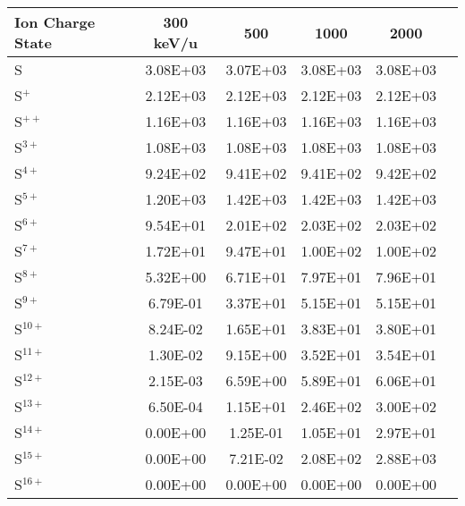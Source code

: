 \begin{table}[ht]
\begin{tabular}{l|c|c|c|c|c}
    Ion Charge State & 300 keV/u & 500 & 1000 & 2000 & \\
    \hline
    S         & 3.08E+03 & 3.07E+03 & 3.08E+03 & 3.08E+03 & \\
    S$^+$     & 2.12E+03 & 2.12E+03 & 2.12E+03 & 2.12E+03 & \\
    S$^{ ++}$ & 1.16E+03 & 1.16E+03 & 1.16E+03 & 1.16E+03 & \\
    S$^{ 3+}$ & 1.08E+03 & 1.08E+03 & 1.08E+03 & 1.08E+03 & \\
    S$^{ 4+}$ & 9.24E+02 & 9.41E+02 & 9.41E+02 & 9.42E+02 & \\
    S$^{ 5+}$ & 1.20E+03 & 1.42E+03 & 1.42E+03 & 1.42E+03 & \\
    S$^{ 6+}$ & 9.54E+01 & 2.01E+02 & 2.03E+02 & 2.03E+02 & \\
    S$^{ 7+}$ & 1.72E+01 & 9.47E+01 & 1.00E+02 & 1.00E+02 & \\
    S$^{ 8+}$ & 5.32E+00 & 6.71E+01 & 7.97E+01 & 7.96E+01 & \\
    S$^{ 9+}$ & 6.79E-01 & 3.37E+01 & 5.15E+01 & 5.15E+01 & \\
    S$^{10+}$ & 8.24E-02 & 1.65E+01 & 3.83E+01 & 3.80E+01 & \\
    S$^{11+}$ & 1.30E-02 & 9.15E+00 & 3.52E+01 & 3.54E+01 & \\
    S$^{12+}$ & 2.15E-03 & 6.59E+00 & 5.89E+01 & 6.06E+01 & \\
    S$^{13+}$ & 6.50E-04 & 1.15E+01 & 2.46E+02 & 3.00E+02 & \\
    S$^{14+}$ & 0.00E+00 & 1.25E-01 & 1.05E+01 & 2.97E+01 & \\
    S$^{15+}$ & 0.00E+00 & 7.21E-02 & 2.08E+02 & 2.88E+03 & \\
    S$^{16+}$ & 0.00E+00 & 0.00E+00 & 0.00E+00 & 0.00E+00 & \\
    \hline
    \end{tabular}
    \label{tab:SulDEProd}
\end{table}

